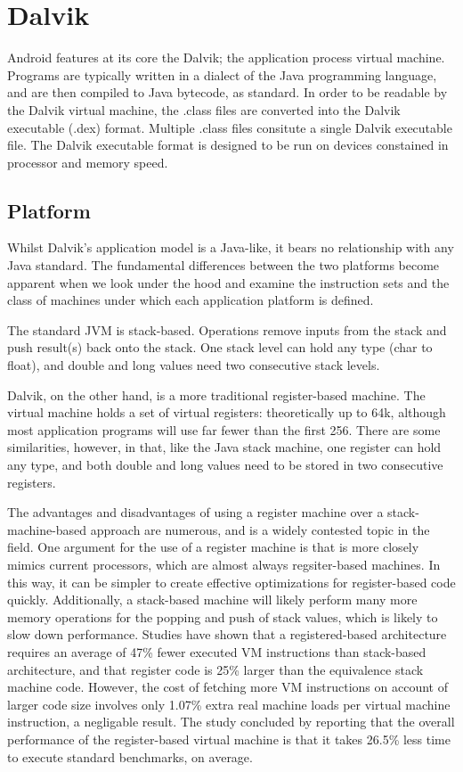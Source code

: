 \section{Dalvik}
\label{sec:dalvik}

Android features at its core the Dalvik; the application process virtual machine. Programs are typically written in a dialect of the Java programming language, and are then compiled to Java bytecode, as standard. In order to be readable by the Dalvik virtual machine, the .class files are converted into the Dalvik executable (.dex) format. Multiple .class files consitute a single Dalvik executable file. The Dalvik executable format is designed to be run on devices constained in processor and memory speed.

\subsection*{Platform}

Whilst Dalvik's application model is a Java-like, it bears no relationship with any Java standard. The fundamental differences between the two platforms become apparent when we look under the hood and examine the instruction sets and the class of machines under which each application platform is defined.

The standard JVM is stack-based. Operations remove inputs from the stack and push result(s) back onto the stack. One stack level can hold any type (char to float), and double and long values need two consecutive stack levels.

Dalvik, on the other hand, is a more traditional register-based machine. The virtual machine holds a set of virtual registers: theoretically up to 64k, although most application programs will use far fewer than the first 256. There are some similarities, however, in that, like the Java stack machine, one register can hold any type, and both double and long values need to be stored in two consecutive registers.

The advantages and disadvantages of using a register machine over a stack-machine-based approach are numerous, and is a widely contested topic in the field. One argument for the use of a register machine is that is more closely mimics current processors, which are almost always regsiter-based machines. In this way, it can be simpler to create effective optimizations for register-based code quickly. Additionally, a stack-based machine will likely perform many more memory operations for the popping and push of stack values, which is likely to slow down performance. Studies have shown that a registered-based architecture requires an average of 47\% fewer executed VM instructions than stack-based architecture\cite{vmshowdown}, and that register code is 25\% larger than the equivalence stack machine code\cite{vmshowdown}. However, the cost of fetching more VM instructions on account of larger code size involves only 1.07\% extra real machine loads per virtual machine instruction\cite{vmshowdown}, a negligable result. The study concluded by reporting that the overall performance of the register-based virtual machine is that it takes 26.5\% less time to execute standard benchmarks, on average\cite{vmshowdown}.

